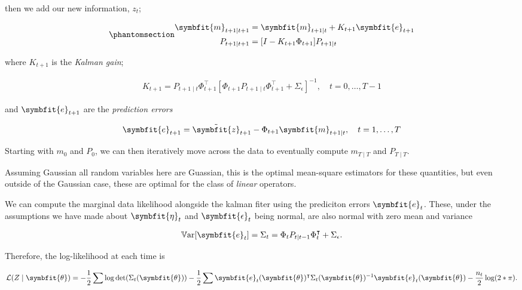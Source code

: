 \documentclass[
]{report}
\newcommand{\bv}[1]{\symbfit{#1}}
\theoremstyle{plain}
\theoremstyle{plain}
\theoremstyle{plain}
\theoremstyle{remark}
\begin{document}
then we add our new information, \(z_{t}\);

\begin{equation}\phantomsection\label{eq-kalman-update}{\begin{split}
\bv m_{t+1\mid t+1} &= \bv m_{t+1\mid t} + K_{t+1} \bv e_{t+1}\\
P_{t+1\mid t+1} &= [I- K_{t+1}\Phi_{t+1}]P_{t+1\mid t}
\end{split} 
}\end{equation}

where \(K_{t+1}\) is the \emph{Kalman gain};

\[\begin{split}
K_{t+1} = P_{t+1\mid t}\Phi_{t+1}^\intercal [\Phi_{t+1} P_{t+1\mid t} \Phi_{t+1}^\intercal + \Sigma_\epsilon]^{-1}, \quad t=0,\dots,T-1
\end{split}
\]

and \(\bv e_{t+1}\) are the \emph{prediction errors}

\[\begin{split}
\bv e_{t+1} = \tilde{\bv z}_{t+1}-\Phi_{t+1} \bv m_{t+1\mid t}, \quad t=1,\dots,T 
\end{split}
\]

Starting with \(m_0\) and \(P_0\), we can then iteratively move across
the data to eventually compute \(m_{T\mid T}\) and \(P_{T\mid T}\).

Assuming Gaussian all random variables here are Guassian, this is the
optimal mean-square estimators for these quantities, but even outside of
the Gaussian case, these are optimal for the class of \emph{linear}
operators.

We can compute the marginal data likelihood alongside the kalman fiter
using the prediciton errors \(\bv e_t\). These, under the assumptions we
have made about \(\bv \eta_t\) and \(\bv\epsilon_t\) being normal, are
also normal with zero mean and variance

\[\begin{split}
\mathbb V\mathrm{ar}[\bv e_t]=\Sigma_t= \Phi_{t} P_{t\mid t-1} \Phi_{t}^\intercal + \Sigma_\epsilon. 
\end{split}
\]

Therefore, the log-likelihood at each time is

\[\begin{split}
\mathcal L(Z\mid\bv\theta) = -\frac12\sum \log\det(\Sigma_t(\bv\theta)) - \frac12 \sum\bv e_t(\bv\theta)^\intercal\Sigma_{t}(\bv\theta)^{-1} \bv e_t(\bv\theta) - \frac{n_{t}}{2}\log(2*\pi).
\end{split}
\]
\end{document}
